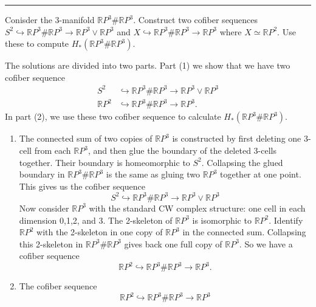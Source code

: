 \documentclass[a4paper, 12pt]{article}
\begin{document}
\noindent\rule{7in}{2.8pt}
\begin{problem}{6}
Conisder the \(3\)-manifold \(\mathbb{R}P^3\#\mathbb{R}P^3\). Construct two cofiber sequences \(S^2\hookrightarrow \mathbb{R}P^3\#\mathbb{R}P^3\rightarrow \mathbb{R}P^3\vee \mathbb{R}P^3\) and 
\(X\hookrightarrow \mathbb{R}P^3\#\mathbb{R}P^3\rightarrow \mathbb{R}P^3\) where \(X\simeq \mathbb{R}P^2\). Use these to compute \(H_*(\mathbb{R}P^3\#\mathbb{R}P^3)\).
\end{problem}
\begin{solution}
The solutions are divided into two parts. Part (1) we show that we have two cofiber sequence 
\begin{align*}
	S^2&\hookrightarrow \mathbb{R}P^3\#\mathbb{R}P^3\rightarrow \mathbb{R}P^3\vee \mathbb{R}P^3\\ 
	\mathbb{R}P^2&\hookrightarrow \mathbb{R}P^3\# \mathbb{R}P^3\rightarrow \mathbb{R}P^3.
\end{align*}
In part (2), we use these two cofiber sequence to calculate \(H_*(\mathbb{R}P^3\# \mathbb{R}P^3)\).
\begin{enumerate}[(1)]
\item The connected sum of two copies of \(\mathbb{R}P^3\) is constructed by first deleting one 3-cell from each \(\mathbb{R}P^3\), and then glue the boundary of the deleted 3-cells together. Their boundary 
is homeomorphic to \(S^2\). Collapsing the glued boundary in \(\mathbb{R}P^3\# \mathbb{R}P^3\) is the same as gluing two \(\mathbb{R}P^3\) together at one point. This gives us the cofiber sequence 
\[S^2\hookrightarrow \mathbb{R}P^3\#\mathbb{R}P^3\rightarrow \mathbb{R}P^3\vee \mathbb{R}P^3\]
Now consider \(\mathbb{R}P^3\) with the standard CW complex structure: one cell in each dimension 0,1,2, and 3. The 2-skeleton of \(\mathbb{R}P^3\) is isomorphic to \(\mathbb{R}P^2\). Identify \(\mathbb{R}P^2\) with the 2-skeleton 
in one copy of \(\mathbb{R}P^3\) in the connected sum. Collapsing this 2-skeleton in \(\mathbb{R}P^3\# \mathbb{R}P^3\) gives back one full copy of \(\mathbb{R}P^3\). So we have a cofiber sequence 
\[\mathbb{R}P^2\hookrightarrow \mathbb{R}P^3\# \mathbb{R}P^3\rightarrow \mathbb{R}P^3.\]
\item The cofiber sequence 
\[\mathbb{R}P^2\hookrightarrow \mathbb{R}P^3\# \mathbb{R}P^3\rightarrow \mathbb{R}P^3\]

\end{enumerate}
\end{solution}
\end{document}
